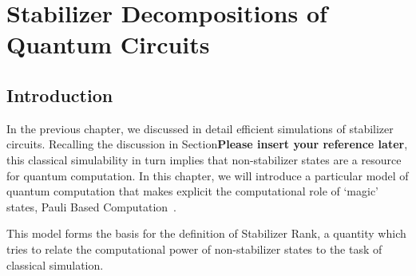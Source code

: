 
\chapter{Stabilizer Decompositions of Quantum Circuits}
\label{chap:stabrank}

\section{Introduction}
In the previous chapter, we discussed in detail efficient simulations of stabilizer circuits. Recalling the discussion in Section\textbf{Please insert your reference later}, this classical simulability in turn implies that non-stabilizer states are a resource for quantum computation. In this chapter, we will introduce a particular model of quantum computation that makes explicit the computational role of `magic' states, Pauli Based Computation~\cite{Bravyi2015,Yoganathan2019}.\par
This model forms the basis for the definition of Stabilizer Rank, a quantity which tries to relate the computational power of non-stabilizer states to the task of classical simulation.
